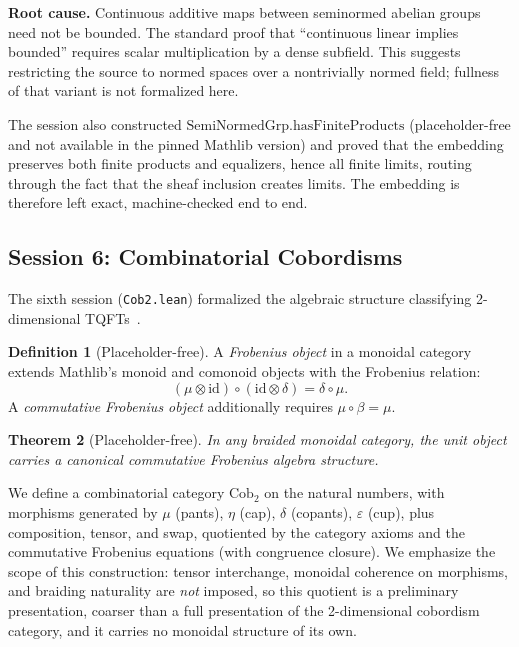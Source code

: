 \documentclass[11pt]{amsart}
\theoremstyle{plain}
\newtheorem{theorem}{Theorem}[section]
\theoremstyle{definition}
\newtheorem{definition}[theorem]{Definition}
\newcommand{\SemiNormedGrp}{\mathrm{SemiNormedGrp}}
\newcommand{\id}{\mathrm{id}}
\begin{document}
\textbf{Root cause.} Continuous additive maps between seminormed abelian groups need not be bounded. The standard proof that ``continuous linear implies bounded'' requires scalar multiplication by a dense subfield. This suggests restricting the source to normed spaces over a nontrivially normed field; fullness of that variant is not formalized here.

The session also constructed $\SemiNormedGrp.\mathrm{hasFiniteProducts}$ (placeholder-free and not available in the pinned Mathlib version) and proved that the embedding preserves both finite products and equalizers, hence all finite limits, routing through the fact that the sheaf inclusion creates limits. The embedding is therefore left exact, machine-checked end to end.

\subsection{Session 6: Combinatorial Cobordisms}

The sixth session (\texttt{Cob2.lean}) formalized the algebraic structure classifying 2-dimensional TQFTs~\cite{Kock2003}.

\begin{definition}[Placeholder-free]
A \emph{Frobenius object} in a monoidal category extends Mathlib's monoid and comonoid objects with the Frobenius relation:
\[
(\mu \otimes \id) \circ (\id \otimes \delta) = \delta \circ \mu.
\]
A \emph{commutative Frobenius object} additionally requires $\mu \circ \beta = \mu$.
\end{definition}

\begin{theorem}[Placeholder-free]
In any braided monoidal category, the unit object carries a canonical commutative Frobenius algebra structure.
\end{theorem}

We define a combinatorial category $\mathrm{Cob}_2$ on the natural numbers, with morphisms generated by $\mu$ (pants), $\eta$ (cap), $\delta$ (copants), $\varepsilon$ (cup), plus composition, tensor, and swap, quotiented by the category axioms and the commutative Frobenius equations (with congruence closure). We emphasize the scope of this construction: tensor interchange, monoidal coherence on morphisms, and braiding naturality are \emph{not} imposed, so this quotient is a preliminary presentation, coarser than a full presentation of the 2-dimensional cobordism category, and it carries no monoidal structure of its own.
\end{document}
